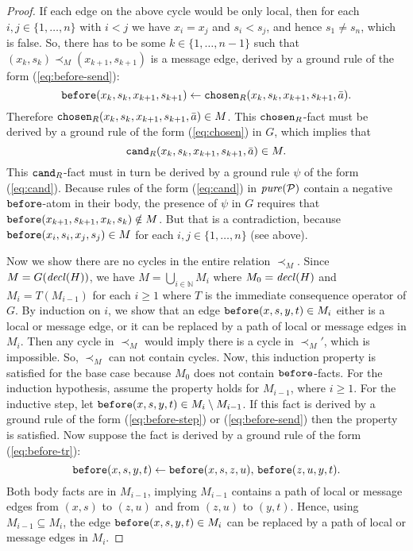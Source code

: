 \documentclass{tlp}
\newcommand{\Nat}{\mathbb{N}}  \newcommand{\len}[1]{|#1|} \newcommand{\rom}[1]{\text{\emph{(#1)}}} \newcommand{\romI}{\rom i}
\newcommand{\ded}{\mathcal{P}}
\newcommand{\grl}{\psi}
\newcommand{\before}{\pred{before}}
\newcommand{\chosen}{\pred{chosen}}
\newcommand{\cand}{\pred{cand}}
\newcommand{\decl}[1]{\fname{decl}(#1)}
\newcommand{\pure}[1]{\fname{pure}(#1)}
\newcommand{\grded}{G}
\newcommand{\cauM}{\prec_{M}}
\begin{document}
\begin{proof}
If each edge on the above cycle would be only local,  then for each
$i,j\in\{1,\ldots,n\}$ with $i<j$ we have $x_{i}=x_{j}$ and $s_{i}<s_{j}$,
and hence $s_{1}\neq s_{n}$, which is false. So, there has to be
some $k\in\{1,\ldots,n-1\}$ such that $(x_{k},s_{k})\cauM(x_{k+1},s_{k+1})$
is a message edge, derived by a ground rule of the form (\ref{eq:before-send}):
\[
\before(x_{k},s_{k},x_{k+1},s_{k+1})\gets\chosen_{R}(x_{k},s_{k},x_{k+1},s_{k+1},\bar{a}).
\]
Therefore $\chosen_{R}(x_{k},s_{k},x_{k+1},s_{k+1},\bar{a})\in M$.
This $\chosen_{R}$-fact must be derived by a ground rule of the form
(\ref{eq:chosen}) in $\grded$, which implies that 
\[
\cand_{R}(x_{k},s_{k},x_{k+1},s_{k+1},\bar{a})\in M.
\]
This $\cand_{R}$-fact must in turn be derived by a ground rule $\grl$
of the form (\ref{eq:cand}). Because rules of the form (\ref{eq:cand})
in $\pure{\ded}$ contain a negative $\before$-atom in their body,
the presence of $\grl$ in $\grded$ requires that $\before(x_{k+1},s_{k+1},x_{k},s_{k})\notin M$.
But that is a contradiction, because $\before(x_{i},s_{i},x_{j},s_{j})\in M$
for each $i,j\in\{1,\ldots,n\}$ (see above).



Now we show there are no cycles in the entire relation $\cauM$. Since
$M=\grded(\decl H)$, we have $M=\bigcup_{i\in\Nat}M_{i}$ where $M_{0}=\decl H$
and $M_{i}=T(M_{i-1})$ for each $i\geq1$ where $T$ is the immediate
consequence operator of $\grded$. By induction on $i$, we show that
an edge $\before(x,s,y,t)\in M_{i}$ either is a local or message
edge, or it can be replaced by a path of local or message edges in
$M_{i}$. Then any cycle in $\cauM$ would imply there is a cycle
in $\cauM'$, which is impossible. So, $\cauM$ can not contain cycles.
Now, this induction property is satisfied for the base case because
$M_{0}$ does not contain $\before$-facts. For the induction hypothesis,
assume the property holds for $M_{i-1}$, where $i\geq1$. For the
inductive step, let $\before(x,s,y,t)\in M_{i}\setminus M_{i-1}$.
If this fact is derived by a ground rule of the form (\ref{eq:before-step})
or (\ref{eq:before-send}) then the property is satisfied. Now suppose
the fact is derived by a ground rule of the form (\ref{eq:before-tr}):
\[
\before(x,s,y,t)\gets\before(x,s,z,u),\,\before(z,u,y,t).
\]
Both body facts are in $M_{i-1}$, implying $M_{i-1}$ contains a
path of local or message edges from $(x,s)$ to $(z,u)$ and from
$(z,u)$ to $(y,t)$. Hence, using $M_{i-1}\subseteq M_{i}$, the
edge $\before(x,s,y,t)\in M_{i}$ can be replaced by a path of local
or message edges in $M_{i}$. \end{proof}
\end{document}
